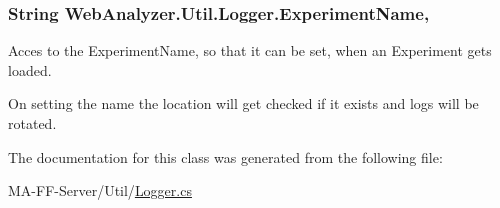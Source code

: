 \subsubsection[{Experiment\+Name}]{\setlength{\rightskip}{0pt plus 5cm}String Web\+Analyzer.\+Util.\+Logger.\+Experiment\+Name\hspace{0.3cm}{\ttfamily [get]}, {\ttfamily [set]}}\label{class_web_analyzer_1_1_util_1_1_logger_ae0228bcd61648d9b38e8aceaaf97024a}


Acces to the Experiment\+Name, so that it can be set, when an Experiment gets loaded. 

On setting the name the location will get checked if it exists and logs will be rotated. 

The documentation for this class was generated from the following file\+:\begin{DoxyCompactItemize}
\item 
M\+A-\/\+F\+F-\/\+Server/\+Util/\hyperlink{_logger_8cs}{Logger.\+cs}\end{DoxyCompactItemize}
